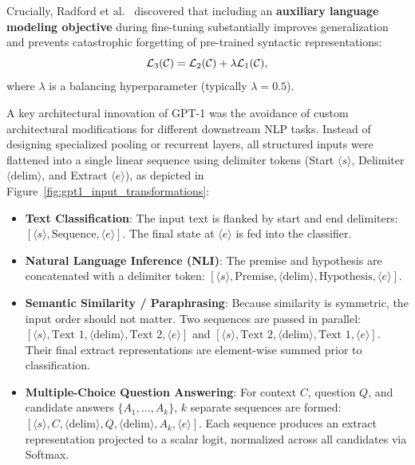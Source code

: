 \documentclass[../../main.tex]{subfiles}
\begin{document}
Crucially, Radford et al.~\cite{radford2018} discovered that including an \textbf{auxiliary language modeling objective} during fine-tuning substantially improves generalization and prevents catastrophic forgetting of pre-trained syntactic representations:
\begin{equation}
\label{eq:gpt1_joint_loss}
\mathcal{L}_3(\mathcal{C}) = \mathcal{L}_2(\mathcal{C}) + \lambda \mathcal{L}_1(\mathcal{C}),
\end{equation}
where $\lambda$ is a balancing hyperparameter (typically $\lambda = 0.5$).

A key architectural innovation of GPT-1 was the avoidance of custom architectural modifications for different downstream NLP tasks. Instead of designing specialized pooling or recurrent layers, all structured inputs were flattened into a single linear sequence using delimiter tokens (Start $\langle s \rangle$, Delimiter $\langle\text{delim}\rangle$, and Extract $\langle e \rangle$), as depicted in Figure~\ref{fig:gpt1_input_transformations}:
\begin{itemize}
    \item \textbf{Text Classification}: The input text is flanked by start and end delimiters: $[\langle s \rangle, \text{Sequence}, \langle e \rangle]$. The final state at $\langle e \rangle$ is fed into the classifier.
    \item \textbf{Natural Language Inference (NLI)}: The premise and hypothesis are concatenated with a delimiter token: $[\langle s \rangle, \text{Premise}, \langle\text{delim}\rangle, \text{Hypothesis}, \langle e \rangle]$.
    \item \textbf{Semantic Similarity / Paraphrasing}: Because similarity is symmetric, the input order should not matter. Two sequences are passed in parallel: $[\langle s \rangle, \text{Text 1}, \langle\text{delim}\rangle, \text{Text 2}, \langle e \rangle]$ and $[\langle s \rangle, \text{Text 2}, \langle\text{delim}\rangle, \text{Text 1}, \langle e \rangle]$. Their final extract representations are element-wise summed prior to classification.
    \item \textbf{Multiple-Choice Question Answering}: For context $C$, question $Q$, and candidate answers $\{A_1, \dots, A_k\}$, $k$ separate sequences are formed: $[\langle s \rangle, C, \langle\text{delim}\rangle, Q, \langle\text{delim}\rangle, A_k, \langle e \rangle]$. Each sequence produces an extract representation projected to a scalar logit, normalized across all candidates via Softmax.
\end{itemize}
\end{document}
